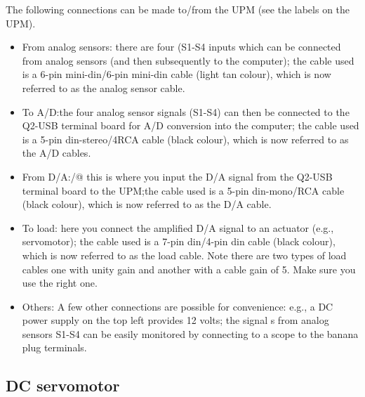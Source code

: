 The following connections can be made to/from the UPM (see the labels on the
UPM).
\begin{itemize}
    \item From analog sensors: there are four (S1-S4 inputs which can be
          connected from analog sensors (and then subsequently to the computer); the
          cable used is a 6-pin mini-din/6-pin mini-din cable (light tan colour), which
          is now referred to as the analog sensor cable.

    \item To A/D:\@ the four analog sensor signals (S1-S4) can then be connected to
          the Q2-USB terminal board for A/D conversion into the computer; the cable
          used is a 5-pin din-stereo/4RCA cable (black colour), which is now referred to
          as the A/D cables.

    \item From D/A:/@ this is where you input the D/A signal from the Q2-USB
          terminal board to the UPM;\@ the cable used is a 5-pin din-mono/RCA cable
          (black colour), which is now referred to as the D/A cable.

    \item To load: here you connect the amplified D/A signal to an actuator
          (e.g., servomotor); the cable used is a 7-pin din/4-pin din cable (black
          colour), which is now referred to as the load cable.  Note there are two types
          of load cables one with unity gain and another with a cable gain of 5.  Make
          sure you use the right one.

    \item Others: A few other connections are possible for convenience: e.g., a
          DC power supply on the top left provides 12 volts; the signal s from analog
          sensors S1-S4 can be easily monitored by connecting to a scope to the banana
          plug terminals.
\end{itemize}

\subsection{DC servomotor}

